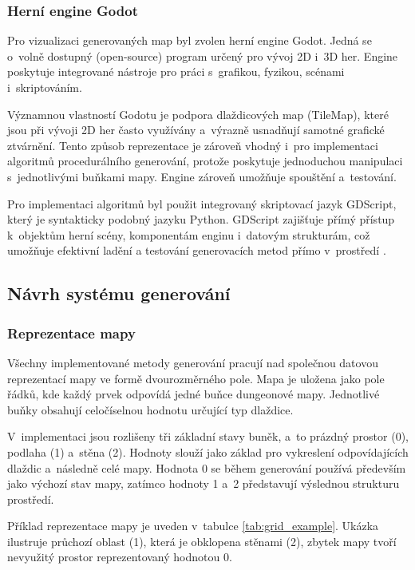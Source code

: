 \documentclass[
   program=itk,
   biblatex,
   figures=true,
   tables=true,
   glossaries,
   index
]{kidiplom}
\begin{document}
\subsubsection{Herní engine Godot}

Pro vizualizaci generovaných map byl zvolen herní engine Godot. Jedná se o~volně dostupný (open-source) program určený pro vývoj 2D i~3D her. Engine poskytuje integrované nástroje pro práci s~grafikou, fyzikou, scénami i~skriptováním.

Významnou vlastností Godotu je podpora dlaždicových map (TileMap), které jsou při vývoji 2D her často využívány a~výrazně usnadňují samotné grafické ztvárnění. Tento způsob reprezentace je zároveň vhodný i~pro implementaci algoritmů procedurálního generování, protože poskytuje jednoduchou manipulaci s~jednotlivými buňkami mapy. Engine zároveň umožňuje spouštění a~testování.

Pro implementaci algoritmů byl použit integrovaný skriptovací jazyk GDScript, který je syntakticky podobný jazyku Python. GDScript zajišťuje přímý přístup k~objektům herní scény, komponentám enginu i~datovým strukturám, což umožňuje efektivní ladění a testování generovacích metod přímo v~prostředí \cite{godot_engine,godot_gdscript}.

\subsection{Návrh systému generování}

\subsubsection{Reprezentace mapy}

Všechny implementované metody generování pracují nad společnou datovou reprezentací mapy ve formě dvourozměrného pole. Mapa je uložena jako pole řádků, kde každý prvek odpovídá jedné buňce dungeonové mapy. Jednotlivé buňky obsahují celočíselnou hodnotu určující typ dlaždice.

V~implementaci jsou rozlišeny tři základní stavy buněk, a~to prázdný prostor (0), podlaha (1) a~stěna (2). Hodnoty slouží jako základ pro vykreslení odpovídajících dlaždic a~následně celé mapy. Hodnota 0 se během generování používá především jako výchozí stav mapy, 
zatímco hodnoty 1 a~2 představují výslednou strukturu prostředí.

Příklad reprezentace mapy je uveden v~tabulce \ref{tab:grid_example}. 
Ukázka ilustruje průchozí oblast (1), která je obklopena stěnami (2), zbytek mapy tvoří nevyužitý prostor reprezentovaný hodnotou 0.
\end{document}
